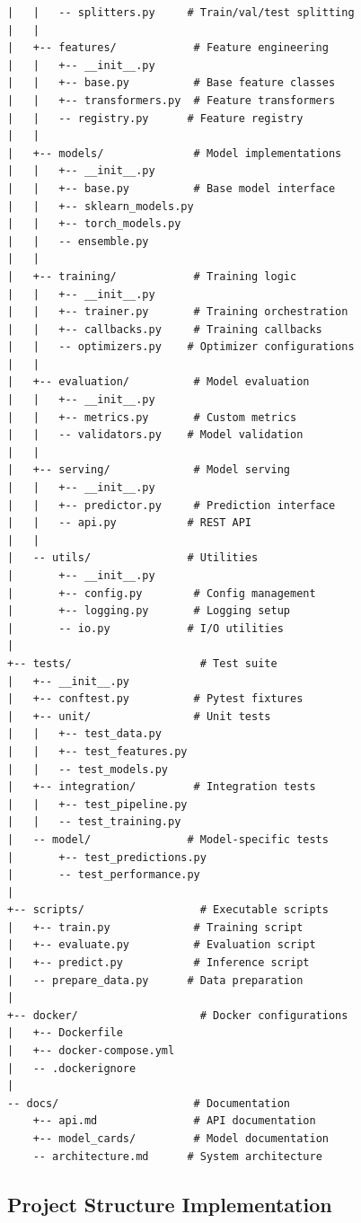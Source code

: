\begin{lstlisting}[style=shell, caption=Comprehensive ML project structure]
|   |   -- splitters.py     # Train/val/test splitting
|   |
|   +-- features/            # Feature engineering
|   |   +-- __init__.py
|   |   +-- base.py          # Base feature classes
|   |   +-- transformers.py  # Feature transformers
|   |   -- registry.py      # Feature registry
|   |
|   +-- models/              # Model implementations
|   |   +-- __init__.py
|   |   +-- base.py          # Base model interface
|   |   +-- sklearn_models.py
|   |   +-- torch_models.py
|   |   -- ensemble.py
|   |
|   +-- training/            # Training logic
|   |   +-- __init__.py
|   |   +-- trainer.py       # Training orchestration
|   |   +-- callbacks.py     # Training callbacks
|   |   -- optimizers.py    # Optimizer configurations
|   |
|   +-- evaluation/          # Model evaluation
|   |   +-- __init__.py
|   |   +-- metrics.py       # Custom metrics
|   |   -- validators.py    # Model validation
|   |
|   +-- serving/             # Model serving
|   |   +-- __init__.py
|   |   +-- predictor.py     # Prediction interface
|   |   -- api.py           # REST API
|   |
|   -- utils/               # Utilities
|       +-- __init__.py
|       +-- config.py        # Config management
|       +-- logging.py       # Logging setup
|       -- io.py            # I/O utilities
|
+-- tests/                    # Test suite
|   +-- __init__.py
|   +-- conftest.py          # Pytest fixtures
|   +-- unit/                # Unit tests
|   |   +-- test_data.py
|   |   +-- test_features.py
|   |   -- test_models.py
|   +-- integration/         # Integration tests
|   |   +-- test_pipeline.py
|   |   -- test_training.py
|   -- model/               # Model-specific tests
|       +-- test_predictions.py
|       -- test_performance.py
|
+-- scripts/                  # Executable scripts
|   +-- train.py             # Training script
|   +-- evaluate.py          # Evaluation script
|   +-- predict.py           # Inference script
|   -- prepare_data.py      # Data preparation
|
+-- docker/                   # Docker configurations
|   +-- Dockerfile
|   +-- docker-compose.yml
|   -- .dockerignore
|
-- docs/                     # Documentation
    +-- api.md               # API documentation
    +-- model_cards/         # Model documentation
    -- architecture.md      # System architecture
\end{lstlisting}

\subsection{Project Structure Implementation}

